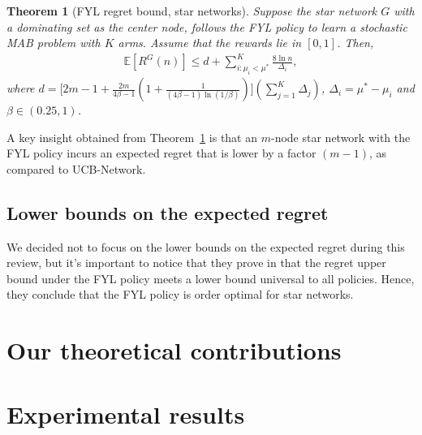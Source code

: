 \documentclass{article}
\newtheorem{theorem}{Theorem}
\begin{document}
\begin{theorem}[FYL regret bound, star networks]
\label{Thm:5.1}
Suppose the star network $G$ with a dominating set as the center node, follows the FYL policy to learn a stochastic MAB problem with $K$ arms. Assume that the rewards lie in $[0,1]$. Then,
\begin{align*}
\mathbb{E}[R^G(n)] \leq d + \sum\limits_{i:\mu_i < \mu^*}^K \frac{8 \ln n}{\Delta_i},
\end{align*}
where $d = \Big[ 2m - 1 + \frac{2 m}{4 \beta -1} \left( 1 + \frac{1}{(4 \beta -1) \ln (1/ \beta)} \right) \Big] \left( \sum\limits_{j=1}^K \Delta_j \right)$, $\Delta_i= \mu^* - \mu_i$ and $\beta \in (0.25,1)$.
\end{theorem}

A key insight obtained from Theorem~\ref{Thm:5.1} is that an $m$-node star network with the FYL policy incurs an expected regret that is lower by a factor $(m - 1)$, as compared to UCB-Network.

\subsection{Lower bounds on the expected regret}

We decided not to focus on the lower bounds on the expected regret during this review, but it's important to notice that they prove in \cite{DBLP:journals/corr/KollaJG16} that the regret upper bound under the FYL policy meets a lower bound universal to all policies. Hence, they conclude that the FYL policy is order optimal for star networks.


\section{Our theoretical contributions}



\newpage

\section{Experimental results}
\end{document}
